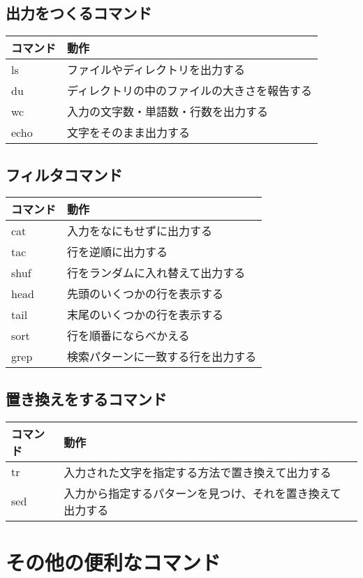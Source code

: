 \subsection{出力をつくるコマンド}
\begin{tabular}{ll}
    コマンド & 動作 \\ \hline
    ls & ファイルやディレクトリを出力する \\
    du & ディレクトリの中のファイルの大きさを報告する\\
    wc & 入力の文字数・単語数・行数を出力する\\
    echo & 文字をそのまま出力する\\ \hline
\end{tabular}


\subsection{フィルタコマンド}
\begin{tabular}{ll}
    コマンド & 動作 \\ \hline
    cat & 入力をなにもせずに出力する \\
    tac & 行を逆順に出力する\\
    shuf & 行をランダムに入れ替えて出力する \\
    head & 先頭のいくつかの行を表示する \\
    tail & 末尾のいくつかの行を表示する\\
    sort & 行を順番にならべかえる\\
    grep & 検索パターンに一致する行を出力する\\ \hline
\end{tabular}


\subsection{置き換えをするコマンド}
\begin{tabular}{ll}
    コマンド & 動作 \\ \hline
    tr & 入力された文字を指定する方法で置き換えて出力する \\
    sed & 入力から指定するパターンを見つけ、それを置き換えて出力する \\ \hline
\end{tabular}


\section{その他の便利なコマンド}

